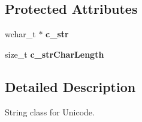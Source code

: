 \subsection*{Protected Attributes}
\begin{DoxyCompactItemize}
\item 
\hypertarget{class_rak_net_1_1_rak_w_string_a91f538f28138d25e2cf1c487dcf33db3}{wchar\-\_\-t $\ast$ {\bfseries c\-\_\-str}}\label{class_rak_net_1_1_rak_w_string_a91f538f28138d25e2cf1c487dcf33db3}

\item 
\hypertarget{class_rak_net_1_1_rak_w_string_a744f26822f605045be736f7afa48c4f9}{size\-\_\-t {\bfseries c\-\_\-str\-Char\-Length}}\label{class_rak_net_1_1_rak_w_string_a744f26822f605045be736f7afa48c4f9}

\end{DoxyCompactItemize}


\subsection{Detailed Description}
String class for Unicode. 

